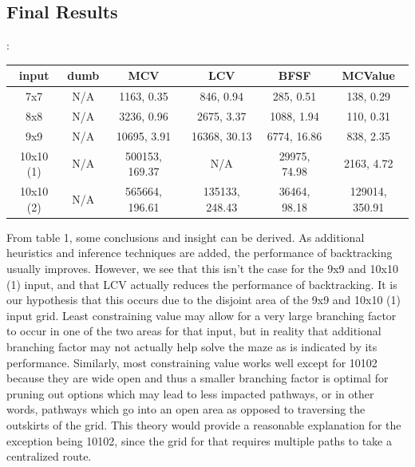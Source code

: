 \documentclass[11pt]{article}
\begin{document}
\subsection*{Final Results}:\\

\begin{center}
 \begin{tabular}{||c c c c c c||}
 \hline
 input & dumb & MCV & LCV & BFSF & MCValue\\ [0.5ex]
 \hline\hline
 7x7 & N/A & 1163, 0.35 & 846, 0.94 & 285, 0.51 & 138, 0.29\\
 \hline
 8x8 & N/A & 3236, 0.96 & 2675, 3.37 & 1088, 1.94 & 110, 0.31\\
 \hline
 9x9 & N/A & 10695, 3.91 & 16368, 30.13 & 6774, 16.86 & 838, 2.35\\
 \hline
 10x10 (1) & N/A & 500153, 169.37 & N/A & 29975, 74.98  & 2163, 4.72\\
 \hline
 10x10 (2) & N/A & 565664, 196.61 & 135133, 248.43 & 36464, 98.18 & 129014, 350.91 \\ [1ex]
 \hline
\end{tabular}
\end{center}


From table 1, some conclusions and insight can be derived. As additional heuristics and inference techniques are added, the performance of backtracking usually improves. However, we see that this isn't the case for the 9x9 and 10x10 (1) input, and that LCV actually reduces the performance of backtracking. It is our hypothesis that this occurs due to the disjoint area of the 9x9 and 10x10 (1) input grid. Least constraining value may allow for a very large branching factor to occur in one of the two areas for that input, but in reality that additional branching factor may not actually help solve the maze as is indicated by its performance. Similarly, most constraining value works well except for 10102 because they are wide open and thus a smaller branching factor is optimal for pruning out options which may lead to less impacted pathways, or in other words, pathways which go into an open area as opposed to traversing the outskirts of the grid. This theory would provide a reasonable explanation for the exception being 10102, since the grid for that requires multiple paths to take a centralized route.
\end{document}
